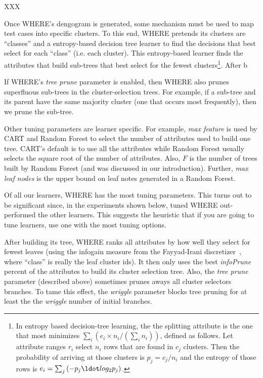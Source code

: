 XXX

Once WHERE's dengogram is generated, some mechanism must be used to map test cases into specific 
clusters. To this end, WHERE pretends its clusters are ``classes'' and 
a entropy-based decision tree learner   to find
the decisions that best select for each ``class'' (i.e. each cluster).
This entropy-based learner  finds the attributes that build sub-trees that best select
for the fewest  clusters\footnote{In entropy based decision-tree learning,  the
the splitting attribute is the one that most  minimizes $\sum_i \left( e_i\times n_i/(\sum_i n_i)\right)$,
defined as follows.
Let    attribute ranges $r_i$ select
$n_i$ rows that are found in $c_j$ clusters.  Then the probability of
arriving at those clusters is $p_j = c_j/n_i$ and the entropy
of those rows is $e_i = \sum_j \left( -p_j \ldot log_2p_j\right)$.}.
\ei
After b

If WHERE's {\em tree prune} parameter is enabled, then WHERE also prunes  superfluous sub-trees
in the cluster-selection trees. For example, if a sub-tree and its parent have the same 
majority cluster
(one that occurs most frequently), then we prune the sub-tree.





Other tuning parameters are learner specific. For example,
{\em max feature} is used by
CART and Random Forest to select the number of attributes
used to build one tree.
CART's default is to use all the attributes while 
Random Forest usually selects the square root of the number
of attributes.
Also,
$F$ is the number of trees built by Random Forest 
(and was
  discussed in our introduction).
 Further,
  {\em max leaf nodes} is the upper bound on leaf notes generated in a 
  Random Forest.

Of all our learners, WHERE has the most tuning parameters. This turns out
to be significant since, in the experiments shown below, tuned WHERE 
out-performed the other learners. This suggests the heuristic that if
you are going to tune learners, use one with the most tuning options.

After building its tree, WHERE ranks all attributes by how well
they select for fewest leaves (using the  infogain measure
from the Fayyad-Irani discretizer~\cite{FayIra93Multi}, where ``class'' is really the leaf cluster ids). It then only uses the best {\em infoPrune} percent of the attributes to build
its cluster selection tree. Also, the {\em tree prune} parameter (described above) sometimes
prunes aways all  cluster selectors branches. To tame this effect, the {\em wriggle} parameter
blocks tree pruning for at least the the   {\em wriggle} number of initial branches.



